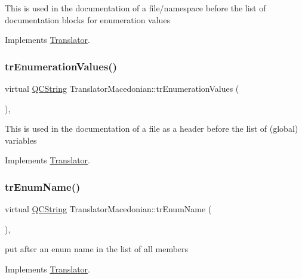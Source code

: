 This is used in the documentation of a file/namespace before the list of documentation blocks for enumeration values 

Implements \mbox{\hyperlink{class_translator}{Translator}}.

\mbox{\label{class_translator_macedonian_aff7dbcb175a4a29900dc15950bad2bd3}} 
\subsubsection{\texorpdfstring{trEnumerationValues()}{trEnumerationValues()}}
{\footnotesize\ttfamily virtual \mbox{\hyperlink{class_q_c_string}{Q\+C\+String}} Translator\+Macedonian\+::tr\+Enumeration\+Values (\begin{DoxyParamCaption}{ }\end{DoxyParamCaption})\hspace{0.3cm}{\ttfamily [inline]}, {\ttfamily [virtual]}}

This is used in the documentation of a file as a header before the list of (global) variables 

Implements \mbox{\hyperlink{class_translator}{Translator}}.

\mbox{\label{class_translator_macedonian_a353ba5b44476c8739f7ec97766f66d0b}} 
\subsubsection{\texorpdfstring{trEnumName()}{trEnumName()}}
{\footnotesize\ttfamily virtual \mbox{\hyperlink{class_q_c_string}{Q\+C\+String}} Translator\+Macedonian\+::tr\+Enum\+Name (\begin{DoxyParamCaption}{ }\end{DoxyParamCaption})\hspace{0.3cm}{\ttfamily [inline]}, {\ttfamily [virtual]}}

put after an enum name in the list of all members 

Implements \mbox{\hyperlink{class_translator}{Translator}}.

\mbox{\label{class_translator_macedonian_ab1aeafce435a1147730b8de47a52c325}} 
